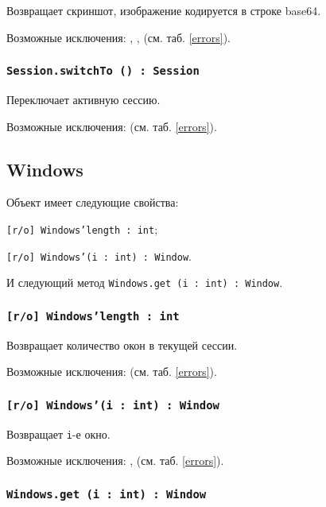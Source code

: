 Возвращает скриншот, изображение кодируется в строке base64.

Возможные исключения: , ,  (см. таб. \ref{errors}).

\subsubsection{\texttt{Session.switchTo () : Session}}

Переключает активную сессию.

Возможные исключения:  (см. таб. \ref{errors}).


\subsection{{\color{orange} Windows}}

Объект \windows{} имеет следующие свойства:
\begin{icItems}
	\item \texttt{[r/o] Windows'length : int};
	\item \texttt{[r/o] Windows'(i : int) : Window}.
\end{icItems}

И следующий метод \texttt{Windows.get (i : int) : Window}.

\subsubsection{\texttt{[r/o] Windows'length : int}}

Возвращает количество окон в текущей сессии.

Возможные исключения:  (см. таб. \ref{errors}).

\subsubsection{\texttt{[r/o] Windows'(i : int) : Window}}

Возвращает \texttt{i}-е окно.

Возможные исключения: ,  (см. таб. \ref{errors}).

\subsubsection{\texttt{Windows.get (i : int) : Window}}

